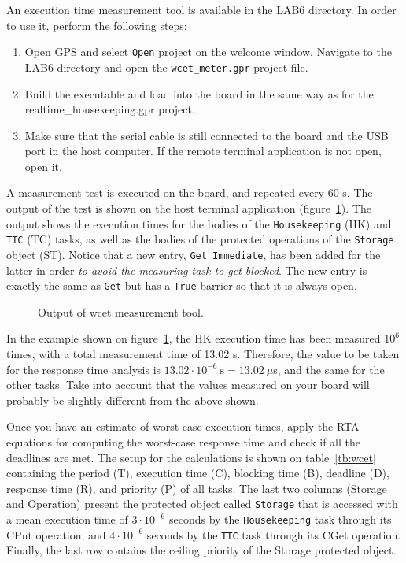 An execution time measurement tool is available in the LAB6 directory. In order to use it, perform the following steps:
\begin{enumerate}
\item Open GPS and select {\tt Open} project on the welcome window. Navigate to the LAB6 directory and open the {\tt wcet\_meter.gpr} project file.
\item Build the executable and load into the board in the same way as for the realtime\_housekeeping.gpr project.
\item Make sure that the serial cable is still connected to the board and the USB port in the host computer. If the remote terminal application is not open, open it.
\end{enumerate}

A measurement test is executed on the board, and repeated every 60 s. The output of the test is shown on the host terminal application (figure~\ref{fig:wcet}). The output shows the execution times for the bodies of the {\tt Housekeeping} (HK) and {\tt TTC} (TC) tasks, as well as the bodies of the protected operations of the {\tt Storage} object (ST). Notice that a new entry, {\tt Get\_Immediate}, has been added for the latter in order \textit{to avoid the measuring task to get blocked}. The new entry is exactly the same as {\tt Get} but has a {\tt True} barrier so that it is always open.

\begin{figure}[h]
            \caption{Output of wcet measurement tool.}
            \label{fig:wcet}
\end{figure}

In the example shown on figure~\ref{fig:wcet}, the HK execution time has been measured $10^{6}$ times, with a total measurement time of 13.02 s. Therefore, the value to be taken for the response time analysis is $13.02\cdot10^{-6}~\text{s} = 13.02~\mu${s}, and the same for the other tasks. Take into account that the values measured on your board will probably be slightly different from the above shown.

Once you have an estimate of worst case execution times, apply the RTA equations for computing the worst-case response time and check if all the deadlines are met. The setup for the calculations is shown on table~\ref{tb:wcet}
containing the period (T), execution time (C),
blocking time (B), deadline (D),
response time (R), and priority (P) of all tasks.
The last two columns (Storage and Operation)
present the protected object called \texttt{Storage}
that is accessed with a mean execution time of
$3\cdot10^{-6}$ seconds by the \texttt{Housekeeping} task through its CPut operation,
and $4\cdot10^{-6}$ seconds by the \texttt{TTC} task through its CGet operation.
Finally, the last row contains the ceiling priority of the Storage protected object. 

